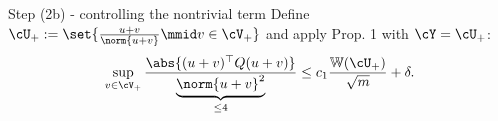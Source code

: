 \documentclass[10pt]{beamer}
\begin{document}
\begin{frame}{Step (2b) - controlling the nontrivial term}
    Define $\cU_+ := \set{\frac{u + v}{\norm{u + v}} \mmid v \in \cV_+}$ and
    apply Prop. 1 with $\cY = \cU_+$:
    \[
        \sup_{v \in \cV_+}
        \frac{\abs{(u + v)^\top Q (u + v)}}{
        \underbrace{\norm{u + v}^2}_{\leq 4}}
        \leq c_1 \frac{\mathbb{W}(\cU_+)}{\sqrt{m}} + \delta.
    \]
\end{frame}


\end{document}
